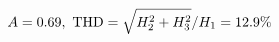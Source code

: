 \documentclass[preview]{standalone}
\begin{document}
\begin{align*}
\special{dvisvgm:raw <g id='unique000'>}A=0.69,\ \text{THD}=\sqrt{H_2^2+H_3^2}/H_1=12.9\%\special{dvisvgm:raw </g>}
\end{align*}
\end{document}
